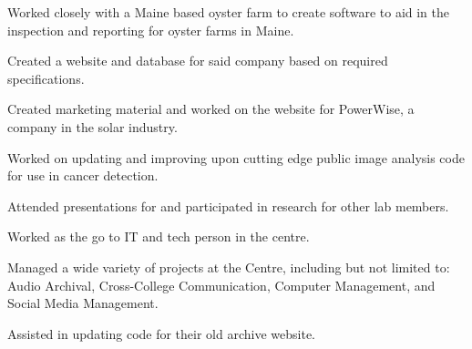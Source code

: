 \documentclass[letterpaper]{deedy-resume} %
\begin{document}
\begin{minipage}[t]{0.66\textwidth}
        \sectionspace %



        \begin{tightitemize}
            \item Worked closely with a Maine based oyster farm to create software to aid in the inspection and reporting for oyster farms in Maine.
            \item Created a website and database for said company based on required specifications.
            \item Created marketing material and worked on the website for PowerWise, a company in the solar industry.
        \end{tightitemize}

        \sectionspace %



        \begin{tightitemize}
            \item Worked on updating and improving upon cutting edge public image analysis code for use in cancer detection.
            \item Attended presentations for and participated in research for other lab members.
        \end{tightitemize}

        \sectionspace %




        \begin{tightitemize}
            \item Worked as the go to IT and tech person in the centre.
            \item Managed a wide variety of projects at the Centre, including but not limited to: Audio Archival, Cross-College Communication, Computer Management, and Social Media Management.
            \item Assisted in updating code for their old archive website.
        \end{tightitemize}


\end{minipage}
\end{document}
